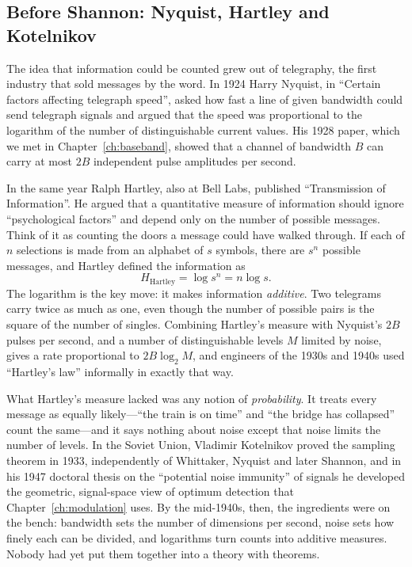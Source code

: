 
\subsection{Before Shannon: Nyquist, Hartley and Kotelnikov}

The idea that information could be counted grew out of telegraphy, the first industry that sold
messages by the word. In 1924 Harry Nyquist, in ``Certain factors affecting telegraph speed'',
asked how fast a line of given bandwidth could send telegraph signals and argued that the speed
was proportional to the logarithm of the number of distinguishable current values. His 1928 paper,
which we met in Chapter~\ref{ch:baseband}, showed that a channel of bandwidth $B$ can carry at most
$2B$ independent pulse amplitudes per second.

In the same year Ralph Hartley, also at Bell Labs, published ``Transmission of Information''. He
argued that a quantitative measure of information should ignore ``psychological factors'' and
depend only on the number of possible messages. Think of it as counting the doors a message could
have walked through. If each of $n$ selections is made from an alphabet of $s$ symbols, there are
$s^n$ possible messages, and Hartley defined the information as
\begin{equation}
H_{\text{Hartley}}=\log s^n=n\log s.
\label{eq:ch13:hartley}
\end{equation}
The logarithm is the key move: it makes information \emph{additive}. Two telegrams carry twice
as much as one, even though the number of possible pairs is the square of the number of singles.
Combining Hartley's measure with Nyquist's $2B$ pulses per second, and a number of distinguishable
levels $M$ limited by noise, gives a rate proportional to $2B\log_2 M$, and engineers of the 1930s and
1940s used ``Hartley's law'' informally in exactly that way.

What Hartley's measure lacked was any notion of \emph{probability}. It treats every message as
equally likely---``the train is on time'' and ``the bridge has collapsed'' count the same---and it
says nothing about noise except that noise limits the number of levels. In the Soviet Union,
Vladimir Kotelnikov proved the sampling theorem in 1933, independently of Whittaker, Nyquist and
later Shannon, and in his 1947 doctoral thesis on the ``potential noise immunity'' of signals he
developed the geometric, signal-space view of optimum detection that Chapter~\ref{ch:modulation}
uses. By the mid-1940s, then, the ingredients were on the bench: bandwidth sets the number of
dimensions per second, noise sets how finely each can be divided, and logarithms turn counts into
additive measures. Nobody had yet put them together into a theory with theorems.

